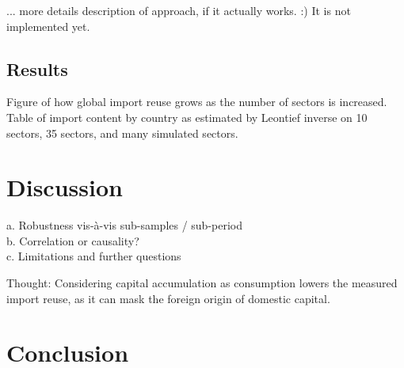 \documentclass[english]{uzhpub}
\begin{document}
... more details description of approach, if it actually works. :) It is not implemented yet.


\subsection{Results}
Figure of how global import reuse grows as the number of sectors is increased.\\
Table of import content by country as estimated by Leontief inverse on 10 sectors, 35 sectors, and many simulated sectors.\\


\section{Discussion}
a.	Robustness vis-à-vis sub-samples / sub-period\\
b.	Correlation or causality?\\
c.	Limitations and further questions

Thought: Considering capital accumulation as consumption lowers the measured import reuse, as it can mask the foreign origin of domestic capital.

\section{Conclusion}
\end{document}
